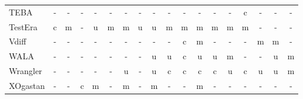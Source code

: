 \begin{longtable}{ l *{17}{c} }
    TEBA &
      - &
      - &
      - &
      - &
      - &
      - &
      - &
      - &
      - &
      - &
      - &
      - &
      - &
      c &
      - &
      - &
      - \\
    TestEra &
      c &
      m &
      - &
      u &
      m &
      m &
      u &
      u &
      m &
      m &
      m &
      m &
      m &
      m &
      - &
      - &
      - \\
    Vdiff &
      - &
      - &
      - &
      - &
      - &
      - &
      - &
      - &
      - &
      c &
      m &
      - &
      - &
      - &
      m &
      m &
      - \\
    WALA &
      - &
      - &
      - &
      - &
      - &
      - &
      - &
      u &
      u &
      c &
      u &
      u &
      m &
      - &
      - &
      u &
      m \\
    Wrangler &
      - &
      - &
      - &
      - &
      - &
      u &
      - &
      u &
      c &
      c &
      c &
      c &
      u &
      c &
      u &
      u &
      m \\
    XOgastan &
      - &
      - &
      c &
      m &
      - &
      m &
      - &
      m &
      - &
      - &
      m &
      - &
      - &
      - &
      - &
      - &
      - \\
  \hline
\end{longtable}

